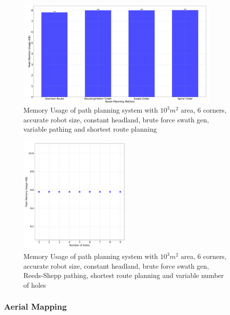 \documentclass[final]{cmpreport_02}
\begin{document}
\begin{figure}[h!]
	\centering
	\includegraphics[width=0.9\textwidth]{./images/pathingRoutePlanningMem.png}
	\caption{Memory Usage of path planning system with $10^3m^2$ area, 6 corners, accurate robot size, constant headland, brute force swath gen, variable pathing and shortest route planning}
	\label{PE:p:RoutePlanningMem}
\end{figure}


\begin{figure}[h!]
	\centering
	\includegraphics[width=0.5\textwidth]{./images/pathingHolesMem.png}
	\caption{Memory Usage of path planning system with $10^3m^2$ area, 6 corners, accurate robot size, constant headland, brute force swath gen, Reeds-Shepp pathing, shortest route planning and variable number of holes}
	\label{PE:p:HolesMem}
\end{figure}


\clearpage
\subsubsection{Aerial Mapping}
\end{document}
